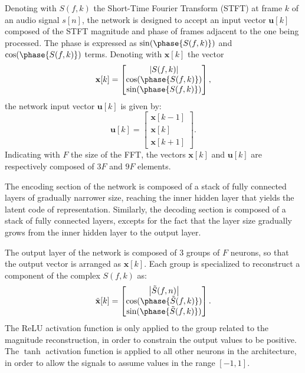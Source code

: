 Denoting with $S(f,k)$ the Short-Time Fourier Transform (STFT) at frame $k$ of an audio signal $s[n]$, the network is designed to accept an input vector $\mathbf{u}[k]$ composed of the STFT magnitude and phase of frames adjacent to the one being processed. The phase is expressed as $\sin(\phase{S(f,k)})$ and $\cos(\phase{S(f,k)})$ terms. Denoting with $\mathbf{x}[k]$ the vector
\begin{equation}
\mathbf{x}[k] = \begin{bmatrix} \left|S(f,k)\right| \\ \cos(\phase{S(f,k)}) \\ \sin(\phase{S(f,k)})  \end{bmatrix},
\end{equation} 
the network input vector $\mathbf{u}[k]$ is given by:
\begin{equation}
\mathbf{u}[k] =   \begin{bmatrix} \mathbf{x}[k-1] \\  \mathbf{x}[k] \\ \mathbf{x}[k+1] \end{bmatrix}.
\end{equation}
Indicating with $F$ the size of the FFT, the vectors $\mathbf{x}[k]$  and $\mathbf{u}[k]$ are respectively composed of $3F$ and $9F$ elements. 

The encoding section of the network is composed of a stack of fully connected layers of gradually narrower size, reaching the inner hidden layer that yields the latent code of representation. Similarly, the decoding section is composed of a stack of fully connected layers, excepts for the fact that the layer size gradually grows from the inner hidden layer to the output layer. 

The output layer of the network is composed of 3 groups of $F$ neurons, so that the output vector is arranged as $\mathbf{x}[k]$. Each group is specialized to reconstruct a component of the complex $S(f,k)$ as:
\begin{equation}
\tilde{\mathbf{x}}[k] = \begin{bmatrix} \left|\tilde{S}(f,n)\right| \\ \cos(\phase{\tilde{S}(f,k)}) \\ \sin(\phase{\tilde{S}(f,k)})  \end{bmatrix}.
\end{equation} 
The ReLU activation function is only applied to the group related to the magnitude reconstruction, in order to constrain the output values to be positive. The $\tanh$ activation function is applied to all other neurons in the architecture, in order to allow the signals to assume values in the range $[-1, 1]$.

